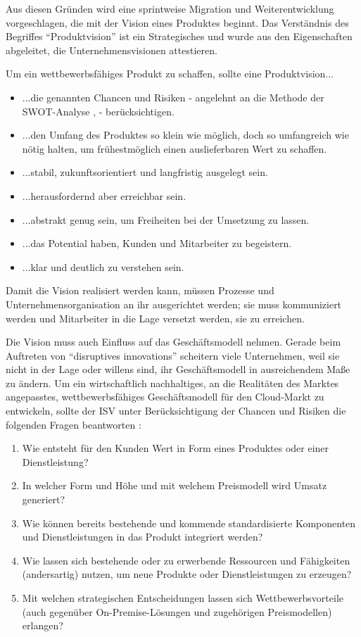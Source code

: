 Aus diesen Gründen wird eine sprintweise Migration und 
Weiterentwicklung vorgeschlagen, die mit der Vision eines Produktes beginnt. 
Das Verständnis des Begriffes "`Produktvision"' ist ein Strategisches und wurde 
aus den Eigenschaften abgeleitet, die  
Unternehmensvisionen attestieren.

Um ein wettbewerbsfähiges Produkt zu schaffen, sollte eine Produktvision...
\begin{itemize}
	\item ...die genannten Chancen und Risiken - angelehnt an die 
Methode der 
SWOT-Analyse 
, 
 - berücksichtigen. 
	\item ...den Umfang des Produktes so klein wie möglich, doch so 
umfangreich wie nötig halten, um frühestmöglich einen auslieferbaren Wert zu 
schaffen.
	\item ...stabil, zukunftsorientiert und langfristig ausgelegt sein.
	\item ...herausfordernd aber erreichbar sein.
	\item ...abstrakt genug sein, um Freiheiten bei der Umsetzung zu 
lassen.
	\item ...das Potential haben, Kunden und Mitarbeiter zu begeistern.
	\item ...klar und deutlich zu verstehen sein.
\end{itemize}
Damit die Vision realisiert werden kann, müssen Prozesse und 
Unternehmensorganisation an ihr ausgerichtet werden; sie muss kommuniziert 
werden und Mitarbeiter in die Lage versetzt werden, sie zu erreichen. 

Die Vision muss auch Einfluss auf das Geschäftsmodell nehmen. Gerade beim 
Auftreten von "`disruptives innovations"' scheitern viele Unternehmen, 
weil sie nicht in der Lage oder willens sind, ihr Geschäftsmodell in 
ausreichendem Maße zu ändern. 
 Um ein 
wirtschaftlich nachhaltiges, an die Realitäten des Marktes angepasstes, 
wettbewerbsfähiges Geschäftsmodell für den Cloud-Markt zu entwickeln, sollte 
der ISV unter Berücksichtigung der Chancen und Risiken die folgenden Fragen 
beantworten :
\begin{enumerate}
	\item Wie entsteht für den Kunden Wert in Form eines Produktes oder 
		einer Dienstleistung?
	\item In welcher Form und Höhe und mit welchem Preismodell wird Umsatz 
generiert? 
	\item Wie können bereits bestehende und kommende standardisierte 
Komponenten und Dienstleistungen in das Produkt integriert werden?
	\item Wie lassen sich bestehende oder zu erwerbende Ressourcen und 
Fähigkeiten (andersartig) nutzen, um neue Produkte oder Dienstleistungen zu 
erzeugen?
	\item Mit welchen strategischen Entscheidungen lassen sich 
Wettbewerbsvorteile (auch gegenüber On-Premise-Lösungen und 
zugehörigen Preismodellen) erlangen?
\end{enumerate}

